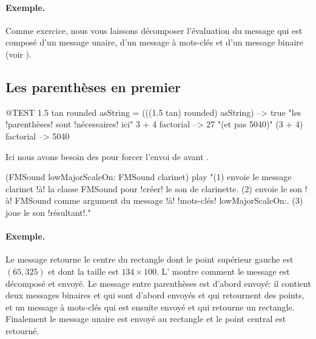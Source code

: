 \documentclass[a4paper,10pt,twoside]{book}
\begin{document}
\paragraph{Exemple.} Comme exercice, nous vous laissons décomposer
l'évaluation du message  qui est composé
d'un message unaire, d'un message à mots-clés et d'un message
binaire (voir ).

\subsection{Les parenthèses en premier}


\begin{code}{@TEST}
1.5 tan rounded asString = (((1.5 tan) rounded) asString) --> true    "les !parenthèses! sont !nécessaires! ici"
3 + 4 factorial   --> 27    "(et pas 5040)"
(3 + 4) factorial --> 5040
\end{code}

Ici nous avons besoin des  pour forcer l'envoi de  avant .
\begin{code}{}
(FMSound lowMajorScaleOn: FMSound clarinet) play 
"(1) envoie le message clarinet !à! la classe FMSound pour !créer! le son de clarinette.
 (2) envoie le son !à! FMSound comme argument du message !à! !mots-clés! lowMajorScaleOn:.
 (3) joue le son !résultant!."
\end{code}



\paragraph{Exemple.}
Le message  retourne le centre
du rectangle dont le point supérieur gauche est $(65, 325)$ et dont
la taille est $134{\times}100$. L' montre comment le
message est décomposé et envoyé. Le message entre parenthèses
est d'abord envoyé: il contient deux messages binaires 
et  qui sont d'abord envoyés et qui retournent des
points, et un message à mots-clés  qui est ensuite
envoyé et qui retourne un rectangle. Finalement le message unaire
 est envoyé au rectangle et le point central est retourné.
\end{document}
